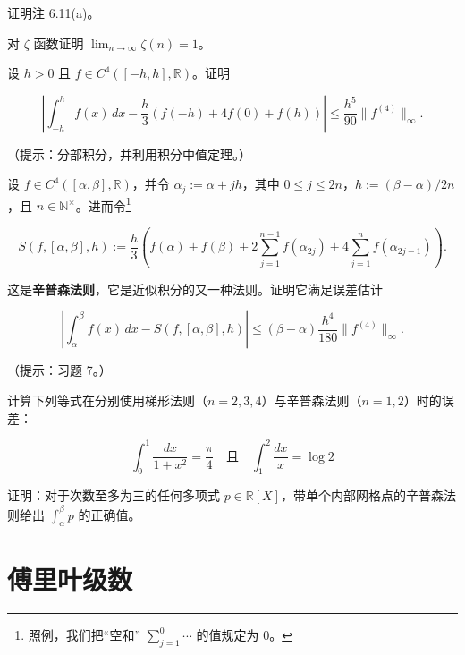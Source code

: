 \begin{exercises}
\item

证明注 6.11(a)。

\item

对 $ \zeta $ 函数证明 $ \lim_{n \to \infty} \zeta(n) = 1 $。

\item

设 $ h > 0 $ 且 $ f \in C^4([-h, h], \mathbb{R}) $。证明

\[
\left| \int_{-h}^{h} f(x) \, dx - \frac{h}{3} \left( f(-h) + 4f(0) + f(h) \right) \right| \le \frac{h^5}{90} \|f^{(4)}\|_\infty .
\]

（提示：分部积分，并利用积分中值定理。）

\item

设 $ f \in C^4([\alpha, \beta], \mathbb{R}) $，并令 $ \alpha_j := \alpha + jh $，其中 $ 0 \le j \le 2n $，$ h := (\beta - \alpha)/2n $，且 $ n \in \mathbb{N}^\times $。进而令\footnote{照例，我们把“空和” $ \sum_{j=1}^{0} \cdots $ 的值规定为 0。}

\[
S(f, [\alpha, \beta], h) := \frac{h}{3} \left( f(\alpha) + f(\beta) + 2 \sum_{j=1}^{n-1} f(\alpha_{2j}) + 4 \sum_{j=1}^{n} f(\alpha_{2j-1}) \right) .
\]

这是\textbf{辛普森法则}，它是近似积分的又一种法则。证明它满足误差估计

\[
\left| \int_{\alpha}^{\beta} f(x) \, dx - S(f, [\alpha, \beta], h) \right| \le (\beta - \alpha) \frac{h^4}{180} \|f^{(4)}\|_\infty .
\]

（提示：习题 7。）

\item

计算下列等式在分别使用梯形法则（$ n = 2, 3, 4 $）与辛普森法则（$ n = 1, 2 $）时的误差：

\[
\int_{0}^{1} \frac{dx}{1 + x^2} = \frac{\pi}{4} \quad \text{且} \quad \int_{1}^{2} \frac{dx}{x} = \log 2
\]
\item

证明：对于次数至多为三的任何多项式 $ p \in \mathbb{R}[X] $，带单个内部网格点的辛普森法则给出 $ \int_{\alpha}^{\beta} p $ 的正确值。

\end{exercises}

\section{傅里叶级数}

